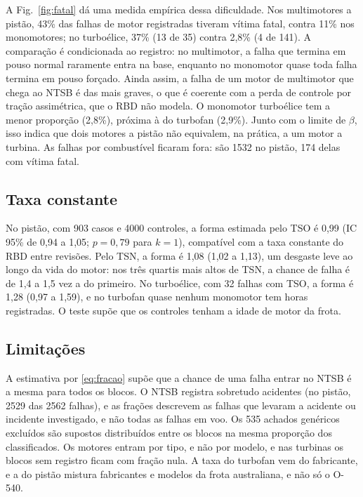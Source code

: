 A Fig.~\ref{fig:fatal} dá uma medida empírica dessa dificuldade.
Nos multimotores a pistão, 43\% das falhas de motor registradas tiveram vítima fatal, contra 11\% nos monomotores; no turboélice, 37\% (13 de 35) contra 2,8\% (4 de 141).
A comparação é condicionada ao registro: no multimotor, a falha que termina em pouso normal raramente entra na base, enquanto no monomotor quase toda falha termina em pouso forçado.
Ainda assim, a falha de um motor de multimotor que chega ao NTSB é das mais graves, o que é coerente com a perda de controle por tração assimétrica, que o RBD não modela.
O monomotor turboélice tem a menor proporção (2,8\%), próxima à do turbofan (2,9\%).
Junto com o limite de $\beta$, isso indica que dois motores a pistão não equivalem, na prática, a um motor a turbina.
As falhas por combustível ficaram fora: são 1532 no pistão, 174 delas com vítima fatal.

\subsection{Taxa constante}\label{sec:weibull}

No pistão, com 903 casos e 4000 controles, a forma estimada pelo TSO é 0,99 (IC 95\% de 0,94 a 1,05; $p=0{,}79$ para $k=1$), compatível com a taxa constante do RBD entre revisões.
Pelo TSN, a forma é 1,08 (1,02 a 1,13), um desgaste leve ao longo da vida do motor: nos três quartis mais altos de TSN, a chance de falha é de 1,4 a 1,5 vez a do primeiro.
No turboélice, com 32 falhas com TSO, a forma é 1,28 (0,97 a 1,59), e no turbofan quase nenhum monomotor tem horas registradas.
O teste supõe que os controles tenham a idade de motor da frota.

\subsection{Limitações}\label{sec:limitacoes}

A estimativa por \eqref{eq:fracao} supõe que a chance de uma falha entrar no NTSB é a mesma para todos os blocos.
O NTSB registra sobretudo acidentes (no pistão, 2529 das 2562 falhas), e as frações descrevem as falhas que levaram a acidente ou incidente investigado, e não todas as falhas em voo.
Os 535 achados genéricos excluídos são supostos distribuídos entre os blocos na mesma proporção dos classificados.
Os motores entram por tipo, e não por modelo, e nas turbinas os blocos sem registro ficam com fração nula.
A taxa do turbofan vem do fabricante, e a do pistão mistura fabricantes e modelos da frota australiana, e não só o O-540.
